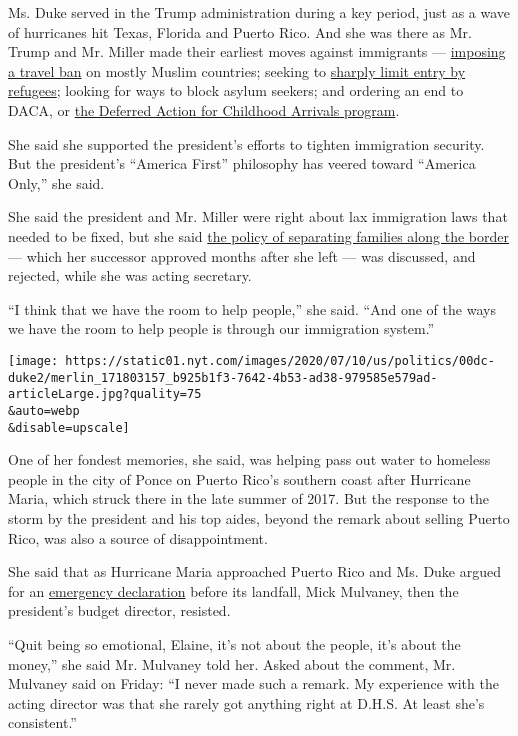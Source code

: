 Ms. Duke served in the Trump administration during a key period, just as
a wave of hurricanes hit Texas, Florida and Puerto Rico. And she was
there as Mr. Trump and Mr. Miller made their earliest moves against
immigrants ---
\href{https://www.nytimes.com/2017/01/27/us/politics/trump-syrian-refugees.html}{imposing
a travel ban} on mostly Muslim countries; seeking to
\href{https://www.nytimes.com/2019/09/26/us/politics/trump-refugees.html}{sharply
limit entry by refugees}; looking for ways to block asylum seekers; and
ordering an end to DACA, or
\href{https://www.nytimes.com/article/what-is-daca.html}{the Deferred
Action for Childhood Arrivals program}.

She said she supported the president's efforts to tighten immigration
security. But the president's ``America First'' philosophy has veered
toward ``America Only,'' she said.

She said the president and Mr. Miller were right about lax immigration
laws that needed to be fixed, but she said
\href{https://www.nytimes.com/2018/06/16/us/politics/family-separation-trump.html}{the
policy of separating families along the border} --- which her successor
approved months after she left --- was discussed, and rejected, while
she was acting secretary.

``I think that we have the room to help people,'' she said. ``And one of
the ways we have the room to help people is through our immigration
system.''

\texttt{[image: https://static01.nyt.com/images/2020/07/10/us/politics/00dc-duke2/merlin\_171803157\_b925b1f3-7642-4b53-ad38-979585e579ad-articleLarge.jpg?quality=75\\\&auto=webp\\\&disable=upscale]}

One of her fondest memories, she said, was helping pass out water to
homeless people in the city of Ponce on Puerto Rico's southern coast
after Hurricane Maria, which struck there in the late summer of 2017.
But the response to the storm by the president and his top aides, beyond
the remark about selling Puerto Rico, was also a source of
disappointment.

She said that as Hurricane Maria approached Puerto Rico and Ms. Duke
argued for an
\href{https://www.whitehouse.gov/briefings-statements/president-donald-j-trump-approves-puerto-rico-emergency-declaration-2/}{emergency
declaration} before its landfall, Mick Mulvaney, then the president's
budget director, resisted.

``Quit being so emotional, Elaine, it's not about the people, it's about
the money,'' she said Mr. Mulvaney told her. Asked about the comment,
Mr. Mulvaney said on Friday: ``I never made such a remark. My experience
with the acting director was that she rarely got anything right at
D.H.S. At least she's consistent.''

